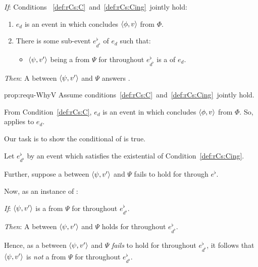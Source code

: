 \begin{note}
  \begin{proposition}
    \label{prop:requ-WhyV}
    \vspace{-\baselineskip}
    \begin{itenum}
    \item[\emph{If}:]
      Conditions~%
      \ref{def:rCs:C}~and~\ref{def:rCs:Cing}~jointly hold:
      \begin{enumerate}[label=\arabic*., ref=\arabic*]
      \item
        \label{def:rCs:C}
        \(e_{d}\) is an event in which \vAgent{} concludes \(\langle \phi, v \rangle\) from \(\Phi\).
      \item
        \label{def:rCs:Cing}
        There is some sub-event \(e^{\flat}_{d^{\flat}}\) of \(e_{d}\) such that:
        \begin{itemize}
        \item
          \(\langle \psi, v' \rangle\) being a \fc{} from \(\Psi\) for \vAgent{} throughout \(e^{\flat}_{d^{\flat}}\) is a \requ{} of \(e_{d}\).
        \end{itemize}
      \end{enumerate}
    \item[\emph{Then}:]
      A  between \(\langle \psi, v' \rangle\) and \(\Psi\) answers \qWhyV{}.
    \end{itenum}
    \vspace{-\baselineskip}
  \end{proposition}

  \begin{argument}{prop:requ-WhyV}
    Assume conditions~\ref{def:rCs:C}~and~\ref{def:rCs:Cing}~jointly hold.

    From Condition~\ref{def:rCs:C}, \(e_{d}\) is an event in which \vAgent{} concludes \(\langle \phi, v \rangle\) from \(\Phi\).
    So, \qWhyV{} applies to \(e_{d}\).

    Our task is to show the conditional of \qWhyV{} is true.

    Let \(e^{\flat}_{d^{\flat}}\) by an event which satisfies the existential of Condition~\ref{def:rCs:Cing}.

    Further, suppose a \ros{} between \(\langle \psi, v' \rangle\) and \(\Psi\) fails to hold for \vAgent{} through \(e^{\flat}\).

    Now, as an instance of \supportII{}:
    \begin{itenum}
    \item[\emph{If}:]
      \(\langle \psi, v' \rangle\) is a  from \(\Psi\) for \vAgent{} throughout \(e^{\flat}_{d^{\flat}}\).
    \item[\emph{Then}:]
      A  between \(\langle \psi, v' \rangle\) and \(\Psi\) holds for \vAgent{} throughout \(e^{\flat}_{d^{\flat}}\).
    \end{itenum}
    \noindent%
    Hence, as a  between \(\langle \psi, v' \rangle\) and \(\Psi\) \emph{fails} to hold for \vAgent{} throughout \(e^{\flat}_{d^{\flat}}\), it follows that \(\langle \psi, v' \rangle\) is \emph{not} a  from \(\Psi\) for \vAgent{} throughout \(e^{\flat}_{d^{\flat}}\).


\end{argument}
\end{note}
